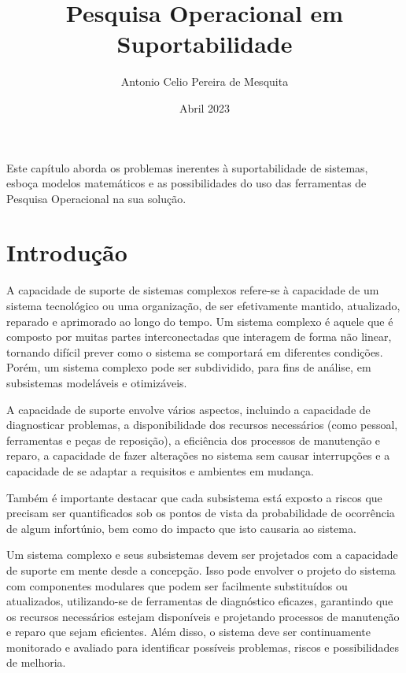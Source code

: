 \documentclass{article}
\begin{document}
	

	
	\title{Pesquisa Operacional em Suportabilidade}
	\author{Antonio Celio Pereira de Mesquita}
	\date{ Abril 2023}
	

\maketitle


	
	Este capítulo aborda os problemas inerentes à suportabilidade de sistemas, esboça modelos matemáticos e as possibilidades do uso das ferramentas de Pesquisa Operacional na sua solução.
	

\section{Introdução}

A capacidade de suporte de sistemas complexos refere-se à capacidade de um sistema tecnológico ou uma organização, de ser efetivamente mantido, atualizado, reparado e aprimorado ao longo do tempo. Um sistema complexo é aquele que é composto por muitas partes interconectadas que interagem de forma não linear, tornando difícil prever como o sistema se comportará em diferentes condições. Porém, um sistema complexo pode ser subdividido, para fins de análise, em subsistemas modeláveis e otimizáveis.

A capacidade de suporte envolve vários aspectos, incluindo a capacidade de diagnosticar problemas, a disponibilidade dos recursos necessários (como pessoal, ferramentas e peças de reposição), a eficiência dos processos de manutenção e reparo, a capacidade de fazer alterações no sistema sem causar interrupções e a capacidade de se adaptar a requisitos e ambientes em mudança.

Também é importante destacar que cada subsistema está exposto a riscos que precisam ser quantificados sob os pontos de vista da probabilidade de ocorrência de algum infortúnio, bem como do impacto que isto causaria ao sistema.

Um sistema complexo e seus subsistemas devem ser projetados com a capacidade de suporte em mente desde a concepção. Isso pode envolver o projeto do sistema com componentes modulares que podem ser facilmente substituídos ou atualizados, utilizando-se de ferramentas de diagnóstico eficazes, garantindo que os recursos necessários estejam disponíveis e projetando processos de manutenção e reparo que sejam eficientes. Além disso, o sistema deve ser continuamente monitorado e avaliado para identificar possíveis problemas, riscos e possibilidades de melhoria.
\end{document}

